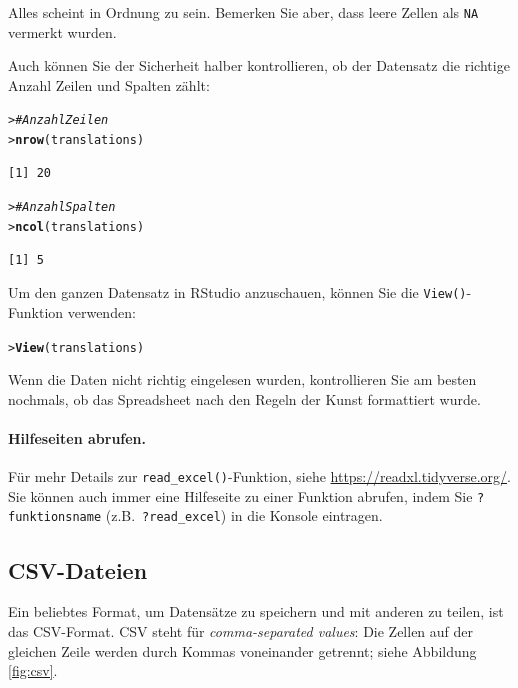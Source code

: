 \documentclass[oneside, 10pt]{book}\usepackage[]{graphicx}\usepackage[]{xcolor}
\makeatletter
\newcommand{\hlcom}[1]{\textcolor[rgb]{0.678,0.584,0.686}{\textit{#1}}}%
\newcommand{\hlstd}[1]{\textcolor[rgb]{0.345,0.345,0.345}{#1}}%
\newcommand{\hlkwd}[1]{\textcolor[rgb]{0.737,0.353,0.396}{\textbf{#1}}}%
\newenvironment{kframe}{%
 \def\at@end@of@kframe{}%
 \ifinner\ifhmode%
  \def\at@end@of@kframe{\end{minipage}}%
  \begin{minipage}{\columnwidth}%
 \fi\fi%
 \def\FrameCommand##1{\hskip\@totalleftmargin \hskip-\fboxsep
 \colorbox{shadecolor}{##1}\hskip-\fboxsep
     \hskip-\linewidth \hskip-\@totalleftmargin \hskip\columnwidth}%
 \MakeFramed {\advance\hsize-\width
   \@totalleftmargin\z@ \linewidth\hsize
   \@setminipage}}%
 {\par\unskip\endMakeFramed%
 \at@end@of@kframe}
\newenvironment{knitrout}{}{} %
\makeatother
\begin{document}
Alles scheint in Ordnung zu sein. Bemerken Sie aber,
dass leere Zellen als \texttt{NA} vermerkt wurden.

Auch können Sie der Sicherheit halber kontrollieren,
ob der Datensatz die richtige Anzahl Zeilen und Spalten
zählt:
\begin{knitrout}
\color{fgcolor}\begin{kframe}
\begin{alltt}
\hlstd{> }\hlcom{# Anzahl Zeilen}
\hlstd{> }\hlkwd{nrow}\hlstd{(translations)}
\end{alltt}
\begin{verbatim}
[1] 20
\end{verbatim}
\begin{alltt}
\hlstd{> }\hlcom{# Anzahl Spalten}
\hlstd{> }\hlkwd{ncol}\hlstd{(translations)}
\end{alltt}
\begin{verbatim}
[1] 5
\end{verbatim}
\end{kframe}
\end{knitrout}

Um den ganzen Datensatz in RStudio anzuschauen, können Sie die \texttt{View()}-Funktion verwenden:

\begin{knitrout}
\color{fgcolor}\begin{kframe}
\begin{alltt}
\hlstd{> }\hlkwd{View}\hlstd{(translations)}
\end{alltt}
\end{kframe}
\end{knitrout}

Wenn die Daten nicht richtig eingelesen wurden, 
kontrollieren Sie am besten nochmals, ob das Spread\-sheet
nach den Regeln der Kunst formattiert wurde.

\paragraph{Hilfeseiten abrufen.} 
Für mehr Details zur \texttt{read\_excel()}-Funktion, siehe
\url{https://readxl.tidyverse.org/}. Sie können auch immer
eine Hilfeseite zu einer Funktion abrufen, indem Sie 
\texttt{?funktionsname} (z.B.\ \texttt{?read\_excel})
in die Konsole eintragen.

\subsection{CSV-Dateien}
Ein beliebtes Format, um Datensätze zu speichern und mit anderen zu teilen,
ist das CSV-Format. CSV steht für \textit{comma-separated values}: Die Zellen
auf der gleichen Zeile werden durch Kommas voneinander getrennt;
siehe Abbildung \ref{fig:csv}.
\end{document}
